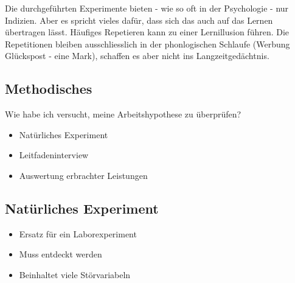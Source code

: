 \documentclass[
  letterpaper,
  DIV=11,
  numbers=noendperiod]{scrartcl}
\providecommand{\tightlist}{%
  \setlength{\itemsep}{0pt}\setlength{\parskip}{0pt}}\usepackage{longtable,booktabs,array}
\begin{document}
Die durchgeführten Experimente bieten - wie so oft in der Psychologie -
nur Indizien. Aber es spricht vieles dafür, dass sich das auch auf das
Lernen übertragen lässt. Häufiges Repetieren kann zu einer Lernillusion
führen. Die Repetitionen bleiben ausschliesslich in der phonlogischen
Schlaufe (Werbung Glückspost - eine Mark), schaffen es aber nicht ins
Langzeitgedächtnis.

\subsection{Methodisches}\label{methodisches}

Wie habe ich versucht, meine Arbeitshypothese zu überprüfen?

\begin{itemize}
\tightlist
\item
  Natürliches Experiment
\item
  Leitfadeninterview
\item
  Auswertung erbrachter Leistungen
\end{itemize}

\subsection{Natürliches Experiment}\label{natuxfcrliches-experiment}

\begin{tcolorbox}[enhanced jigsaw, opacityback=0, arc=.35mm, coltitle=black, opacitybacktitle=0.6, title={Charakteristik}, bottomrule=.15mm, colbacktitle=quarto-callout-note-color!10!white, toprule=.15mm, bottomtitle=1mm, breakable, toptitle=1mm, left=2mm, rightrule=.15mm, leftrule=.75mm, colframe=quarto-callout-note-color-frame, titlerule=0mm, colback=white]

\begin{itemize}
\tightlist
\item
  Ersatz für ein Laborexperiment
\end{itemize}

\end{tcolorbox}

\begin{tcolorbox}[enhanced jigsaw, opacityback=0, arc=.35mm, coltitle=black, opacitybacktitle=0.6, title={Zu bedenken}, bottomrule=.15mm, colbacktitle=quarto-callout-warning-color!10!white, toprule=.15mm, bottomtitle=1mm, breakable, toptitle=1mm, left=2mm, rightrule=.15mm, leftrule=.75mm, colframe=quarto-callout-warning-color-frame, titlerule=0mm, colback=white]

\begin{itemize}
\tightlist
\item
  Muss entdeckt werden
\item
  Beinhaltet viele Störvariabeln
\end{itemize}

\end{tcolorbox}
\end{document}
